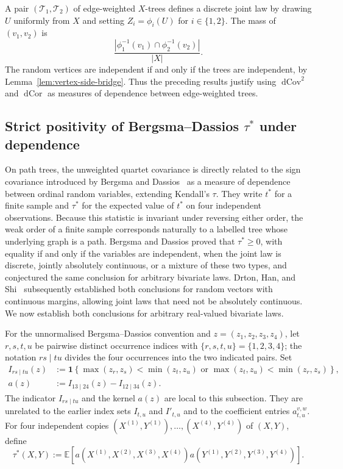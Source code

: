 \documentclass[pdflatex,sn-mathphys-num]{sn-jnl}
\theoremstyle{thmstyleone}
\DeclareMathOperator{\dCov}{dCov}
\DeclareMathOperator{\dCor}{dCor}
\begin{document}
A pair $(\mathcal T_1,\mathcal T_2)$ of edge-weighted $X$-trees defines
a discrete joint law by drawing $U$ uniformly from $X$ and setting
$Z_i=\phi_i(U)$ for $i\in\{1,2\}$.  The mass of
$(v_1,v_2)$ is
\[
\frac{|\phi_1^{-1}(v_1)\cap\phi_2^{-1}(v_2)|}{|X|}.
\]
The random vertices are independent if and only if the trees are independent,
by Lemma~\ref{lem:vertex-side-bridge}.  Thus the preceding results justify
using $\dCov^2$ and $\dCor$ as measures of dependence between edge-weighted
trees.

\subsection{Strict positivity of Bergsma--Dassios
\texorpdfstring{$\tau^*$}{tau-star} under dependence}
\label{subsec:tau-star}

On path trees, the unweighted quartet covariance is directly related to the
sign covariance introduced by Bergsma and
Dassios~\cite{BergsmaDassios2014} as a measure of dependence between ordinal
random variables, extending Kendall's $\tau$.  They write $t^*$ for a finite
sample and $\tau^*$ for the
expected value of $t^*$ on four independent observations.  Because this
statistic is invariant under reversing either order, the weak order
of a finite sample corresponds naturally to a labelled tree whose underlying
graph is a path.  Bergsma and Dassios proved that $\tau^*\ge0$, with
equality if and only if the variables are independent, when the joint law
is discrete, jointly absolutely continuous, or a mixture of these two
types, and conjectured the same conclusion for arbitrary bivariate laws.
Drton, Han, and Shi~\cite{DrtonHanShi2020} subsequently established both
conclusions for random vectors with continuous margins, allowing joint
laws that need not be absolutely continuous.  We now establish both
conclusions for arbitrary real-valued bivariate laws.

For the unnormalised Bergsma--Dassios convention and
$z=(z_1,z_2,z_3,z_4)$, let $r,s,t,u$ be pairwise distinct occurrence indices
with $\{r,s,t,u\}=\{1,2,3,4\}$; the notation $rs\mid tu$ divides the four
occurrences into the two indicated pairs.  Set
\[
\begin{aligned}
I_{rs\mid tu}(z)&:=\mathbf{1}\!\left\{
\max(z_r,z_s)<\min(z_t,z_u)\text{ or }
\max(z_t,z_u)<\min(z_r,z_s)\right\},\\
a(z)&:=I_{13\mid24}(z)-I_{12\mid34}(z).
\end{aligned}
\]
The indicator $I_{rs\mid tu}$ and the kernel $a(z)$ are local to this
subsection.  They are unrelated to the earlier index sets $I_{t,u}$ and
$I'_{t,u}$ and to the coefficient entries $a_{t,u}^{v,w}$.
For four independent copies
$(X^{(1)},Y^{(1)}),\ldots,(X^{(4)},Y^{(4)})$ of $(X,Y)$, define
\[
\tau^*(X,Y):=\mathbb E\!\left[
a(X^{(1)},X^{(2)},X^{(3)},X^{(4)})
a(Y^{(1)},Y^{(2)},Y^{(3)},Y^{(4)})\right].
\]
\end{document}
